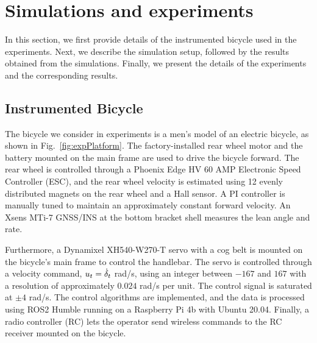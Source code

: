 \section{Simulations and experiments}
\label{sec:4}







In this section, we first provide details of the instrumented bicycle used in the experiments. Next, we describe the simulation setup, followed by the results obtained from the simulations. Finally, we present the details of the experiments and the corresponding results.  


\subsection{Instrumented Bicycle}
The bicycle we consider in experiments is a men's model of an electric bicycle, as shown in Fig.~\ref{fig:expPlatform}. The factory-installed rear wheel motor and the battery mounted on the main frame are used to drive the bicycle forward. The rear wheel is controlled through a Phoenix Edge HV 60 AMP Electronic Speed Controller (ESC), and the rear wheel velocity is estimated using 12 evenly distributed magnets on the rear wheel and a Hall sensor. A PI controller is manually tuned to maintain an approximately constant forward velocity. An Xsens MTi-7 GNSS/INS at the bottom bracket shell measures the lean angle and rate.

Furthermore, a Dynamixel XH540-W270-T servo with a cog belt is mounted on the bicycle's main frame to control the handlebar. The servo is controlled through a velocity command, $u_{t}=\dot{\delta}_{t}$ rad/s, using an integer between $-167$ and $167$ with a resolution of approximately $0.024$ rad/s per unit. The control signal is saturated at $\pm4$ rad/s. The control algorithms are implemented, and the data is processed using ROS2 Humble running on a Raspberry Pi 4b with Ubuntu 20.04. Finally, a radio controller (RC) lets the operator send wireless commands to the RC receiver mounted on the bicycle. 

